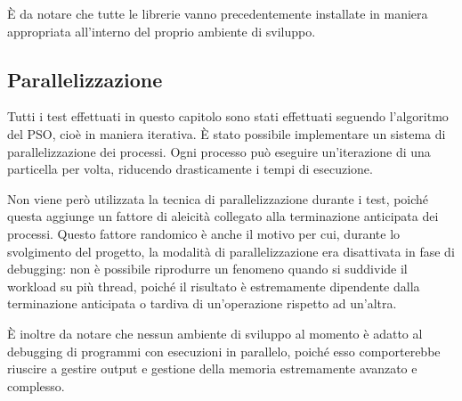 È da notare che tutte le librerie vanno precedentemente installate in maniera appropriata all'interno del proprio ambiente di sviluppo.

\subsection{Parallelizzazione}
\label{chap:pso-extra-paral}
Tutti i test effettuati in questo capitolo sono stati effettuati seguendo l'algoritmo del PSO, cioè in maniera iterativa. È stato possibile implementare un sistema di parallelizzazione dei processi. Ogni processo può eseguire un'iterazione di una particella per volta, riducendo drasticamente i tempi di esecuzione.

Non viene però utilizzata la tecnica di parallelizzazione durante i test, poiché questa aggiunge un fattore di aleicità collegato alla terminazione anticipata dei processi. Questo fattore randomico è anche il motivo per cui, durante lo svolgimento del progetto, la modalità di parallelizzazione era disattivata in fase di debugging: non è possibile riprodurre un fenomeno quando si suddivide il workload su più thread, poiché il risultato è estremamente dipendente dalla terminazione anticipata o tardiva di un'operazione rispetto ad un'altra.

È inoltre da notare che nessun ambiente di sviluppo al momento è adatto al debugging di programmi con esecuzioni in parallelo, poiché esso comporterebbe riuscire a gestire output e gestione della memoria estremamente avanzato e complesso.